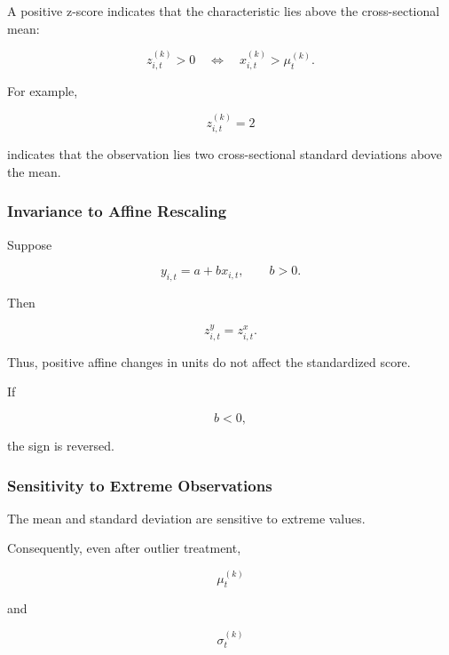 \documentclass[11pt,a4paper]{article}
\begin{document}
A positive z-score indicates that the characteristic lies above the
cross-sectional mean:

\begin{equation}
z_{i,t}^{(k)}>0
\quad\Longleftrightarrow\quad
x_{i,t}^{(k)}
>
\mu_t^{(k)}.
\end{equation}

For example,

\begin{equation}
z_{i,t}^{(k)}=2
\end{equation}

indicates that the observation lies two cross-sectional standard deviations
above the mean.


\subsubsection{Invariance to Affine Rescaling}

Suppose

\begin{equation}
y_{i,t}
=
a
+
b x_{i,t},
\qquad
b>0.
\end{equation}

Then

\begin{equation}
z_{i,t}^{y}
=
z_{i,t}^{x}.
\end{equation}

Thus, positive affine changes in units do not affect the standardized score.

If

\begin{equation}
b<0,
\end{equation}

the sign is reversed.


\subsubsection{Sensitivity to Extreme Observations}

The mean and standard deviation are sensitive to extreme values.

Consequently, even after outlier treatment,

\begin{equation}
\mu_t^{(k)}
\end{equation}

and

\begin{equation}
\sigma_t^{(k)}
\end{equation}
\end{document}
